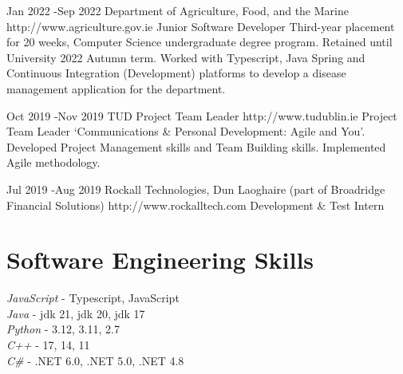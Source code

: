 \documentclass[10pt]{article} %
\begin{document}

\job
{Jan 2022 -}{Sep 2022}
{Department of Agriculture, Food, and the Marine}
{http://www.agriculture.gov.ie}
{Junior Software Developer}
{Third-year placement for 20 weeks, Computer Science undergraduate degree program. Retained until University 2022 Autumn term. Worked with Typescript, Java Spring and Continuous Integration (Development) platforms to develop a disease management application for the department.}


\job
{Oct 2019 -}{Nov 2019}
{TUD Project Team Leader}
{http://www.tudublin.ie}
{Project Team Leader}
{‘Communications \& Personal Development: Agile and You’. Developed Project Management skills and Team Building skills. Implemented Agile methodology.}


\job
{Jul 2019 -}{Aug 2019}
{Rockall Technologies, Dun Laoghaire (part of Broadridge Financial Solutions)}
{http://www.rockalltech.com}
{Development \& Test Intern}
{}




\section{Software Engineering Skills}

{
    \textit{JavaScript} - Typescript, JavaScript\\
    \textit{Java} - jdk 21, jdk 20, jdk 17\\
    \textit{Python} - 3.12, 3.11, 2.7\\
    \textit{C++} - 17, 14, 11\\
    \textit{C\#} - .NET 6.0, .NET 5.0, .NET 4.8\\
}

\end{document}
